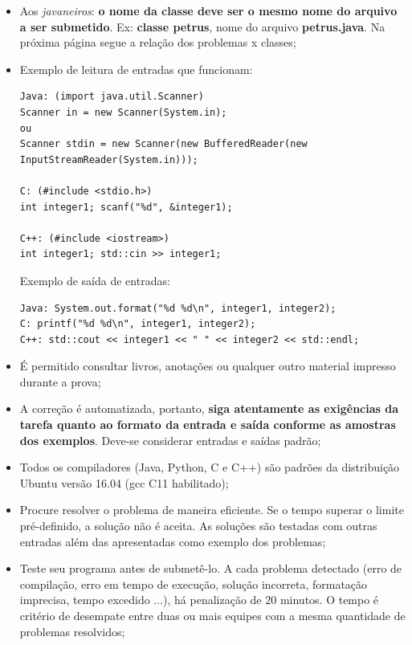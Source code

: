 \documentclass[12pt,oneside]{article}
\begin{document}
\begin{small}
\begin{itemize}
\itemsep -3pt

 \item Aos {\em javaneiros}: {\bf o nome da classe deve ser o mesmo nome do arquivo a ser submetido}.     Ex: {\bf classe petrus}, nome do arquivo {\bf petrus.java}. Na próxima página segue a relação dos problemas x classes;

\item Exemplo de leitura de entradas que funcionam:
\begin{verbatim}
Java: (import java.util.Scanner)
Scanner in = new Scanner(System.in); 
ou
Scanner stdin = new Scanner(new BufferedReader(new InputStreamReader(System.in)));

C: (#include <stdio.h>)
int integer1; scanf("%d", &integer1);

C++: (#include <iostream>)
int integer1; std::cin >> integer1;
\end{verbatim}

Exemplo de saída de entradas:
\begin{verbatim}
Java: System.out.format("%d %d\n", integer1, integer2);
C: printf("%d %d\n", integer1, integer2);
C++: std::cout << integer1 << " " << integer2 << std::endl;
\end{verbatim}

 \item É permitido consultar livros, anotações ou qualquer outro material impresso durante a prova;

 \item A correção é automatizada, portanto, \textbf{siga atentamente as exigências da tarefa quanto ao formato da
       entrada e saída conforme as amostras dos exemplos}. Deve-se  considerar entradas e saídas padrão;
       
 \item Todos os compiladores (Java, Python, C e C++) são padrões da distribuição Ubuntu versão 16.04 (gcc C11 habilitado);         
       
 \item Procure resolver o problema de maneira eficiente. Se o tempo superar o limite pré-definido, a solução não é aceita.
       As soluções são testadas com outras entradas além das apresentadas como exemplo dos problemas;
       
 \item Teste seu programa antes de submetê-lo. A cada problema detectado (erro de compilação, erro em tempo de execução, solução incorreta, formatação imprecisa, tempo excedido $\dots$), há penalização de $20$ minutos.
       O tempo é critério de desempate entre duas ou mais equipes com a mesma quantidade de problemas resolvidos;
       

\end{itemize}
\end{small}
\end{document}

